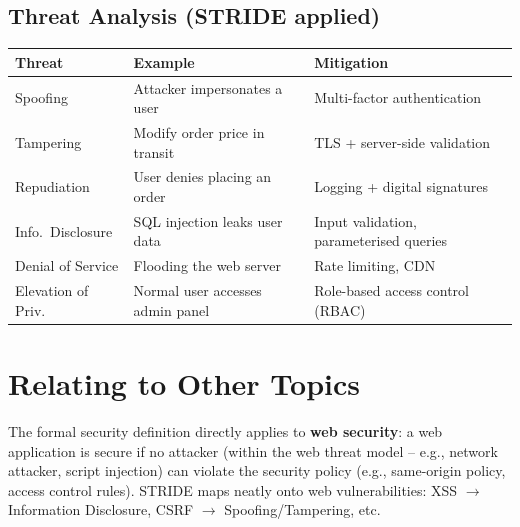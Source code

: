 \documentclass[10pt,a4paper]{article}
\begin{document}
\subsection*{Threat Analysis (STRIDE applied)}
\begin{tabular}{|l|l|l|}
\hline
\textbf{Threat} & \textbf{Example} & \textbf{Mitigation} \\ \hline
Spoofing & Attacker impersonates a user & Multi-factor authentication \\ \hline
Tampering & Modify order price in transit & TLS + server-side validation \\ \hline
Repudiation & User denies placing an order & Logging + digital signatures \\ \hline
Info.\ Disclosure & SQL injection leaks user data & Input validation, parameterised queries \\ \hline
Denial of Service & Flooding the web server & Rate limiting, CDN \\ \hline
Elevation of Priv. & Normal user accesses admin panel & Role-based access control (RBAC) \\ \hline
\end{tabular}

\section*{Relating to Other Topics}
The formal security definition directly applies to \textbf{web security}: a web application is secure if no attacker (within the web threat model -- e.g., network attacker, script injection) can violate the security policy (e.g., same-origin policy, access control rules). STRIDE maps neatly onto web vulnerabilities: XSS $\to$ Information Disclosure, CSRF $\to$ Spoofing/Tampering, etc.
\end{document}
